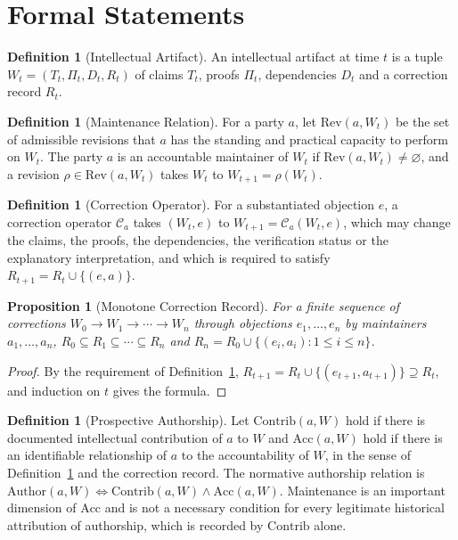 \documentclass[11pt,letterpaper]{report}
\theoremstyle{plain}
\newtheorem{proposition}[theorem]{Proposition}
\theoremstyle{definition}
\newtheorem{definition}[theorem]{Definition}
\theoremstyle{remark}
\begin{document}
\section{Formal Statements}

\begin{definition}[Intellectual Artifact]\label{def:artifact}
An intellectual artifact at time $t$ is a tuple $W_t=(T_t,\Pi_t,D_t,R_t)$ of claims $T_t$, proofs $\Pi_t$, dependencies $D_t$ and a correction record $R_t$.
\end{definition}

\begin{definition}[Maintenance Relation]\label{def:maintenance}
For a party $a$, let $\mathrm{Rev}(a,W_t)$ be the set of admissible revisions that $a$ has the standing and practical capacity to perform on $W_t$. The party $a$ is an accountable maintainer of $W_t$ if $\mathrm{Rev}(a,W_t)\ne\varnothing$, and a revision $\rho\in\mathrm{Rev}(a,W_t)$ takes $W_t$ to $W_{t+1}=\rho(W_t)$.
\end{definition}

\begin{definition}[Correction Operator]\label{def:correction}
For a substantiated objection $e$, a correction operator $\mathcal C_a$ takes $(W_t,e)$ to $W_{t+1}=\mathcal C_a(W_t,e)$, which may change the claims, the proofs, the dependencies, the verification status or the explanatory interpretation, and which is required to satisfy $R_{t+1}=R_t\cup\{(e,a)\}$.
\end{definition}

\begin{proposition}[Monotone Correction Record]\label{pr:monorecord}
For a finite sequence of corrections $W_0\to W_1\to\cdots\to W_n$ through objections $e_1,\dots,e_n$ by maintainers $a_1,\dots,a_n$, $R_0\subseteq R_1\subseteq\cdots\subseteq R_n$ and $R_n=R_0\cup\{(e_i,a_i):1\le i\le n\}$.
\end{proposition}
\begin{proof}
By the requirement of Definition~\ref{def:correction}, $R_{t+1}=R_t\cup\{(e_{t+1},a_{t+1})\}\supseteq R_t$, and induction on $t$ gives the formula.
\end{proof}

\begin{definition}[Prospective Authorship]\label{def:author}
Let $\mathrm{Contrib}(a,W)$ hold if there is documented intellectual contribution of $a$ to $W$ and $\mathrm{Acc}(a,W)$ hold if there is an identifiable relationship of $a$ to the accountability of $W$, in the sense of Definition~\ref{def:maintenance} and the correction record. The normative authorship relation is $\mathrm{Author}(a,W)\iff\mathrm{Contrib}(a,W)\wedge\mathrm{Acc}(a,W)$. Maintenance is an important dimension of $\mathrm{Acc}$ and is not a necessary condition for every legitimate historical attribution of authorship, which is recorded by $\mathrm{Contrib}$ alone.
\end{definition}
\end{document}
